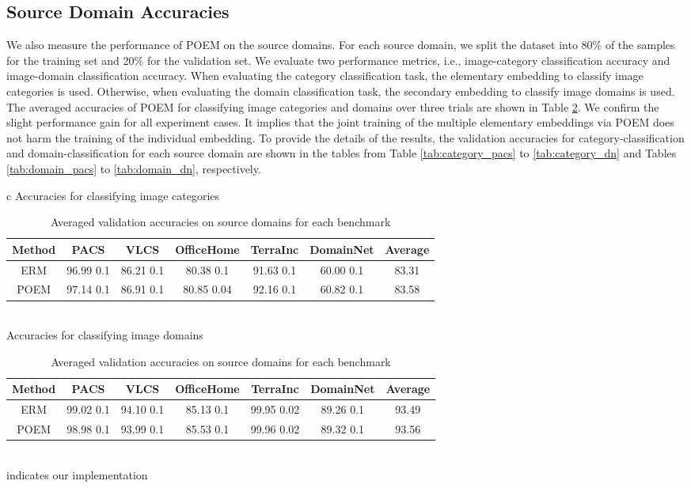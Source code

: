 \documentclass[letterpaper]{article} \usepackage{aaai23}  \usepackage{times}  \usepackage{helvet}  \usepackage{courier}  \usepackage[hyphens]{url}  \usepackage{graphicx} \urlstyle{rm} \def\UrlFont{\rm}  \usepackage{natbib}  \usepackage{caption} \frenchspacing  \setlength{\pdfpagewidth}{8.5in}  \setlength{\pdfpageheight}{11in}  \usepackage[labelsep=period]{caption}
\begin{document}
\subsection{Source Domain Accuracies}
We also measure the performance of POEM on the source domains. For each source domain, we split the dataset into 80\% of the samples for the training set and 20\% for the validation set. 
We evaluate two performance metrics, i.e., image-category classification accuracy and image-domain classification accuracy.
When evaluating the category classification task, the elementary embedding to classify image categories is used. 
Otherwise, when evaluating the domain classification task, the secondary embedding to classify image domains is used.
The averaged accuracies of POEM for classifying image categories and domains over three trials are shown in Table \ref{tab:source_performance}. We confirm the slight performance gain for all experiment cases. It implies that the joint training of the multiple elementary embeddings via POEM does not harm the training of the individual embedding.
To provide the details of the results, the validation accuracies for category-classification and domain-classification for each source domain are shown in the tables from Table \ref{tab:category_pacs} to \ref{tab:category_dn} and Tables \ref{tab:domain_pacs} to \ref{tab:domain_dn}, respectively.

\begin{table}[H]
\centering
	\begin{tabular}{c}
		Accuracies for classifying image categories\\
		\begin{tabular}{cccccc|c}
			\toprule
			\textbf{Method} & PACS & VLCS & OfficeHome & TerraInc & DomainNet & Average\\
			\midrule
			ERM & 96.99  0.1 & 86.21  0.1 & 80.38  0.1 & 91.63  0.1 & 60.00  0.1 & 83.31\\
\midrule
			POEM& 97.14  0.1 & 86.91  0.1 & 80.85  0.04 & 92.16  0.1 & 60.82  0.1 & 83.58\\
\midrule
		\end{tabular}\\
		Accuracies for classifying image domains\\
		\begin{tabular}{cccccc|c}
			\toprule
			\textbf{Method} & PACS & VLCS & OfficeHome & TerraInc & DomainNet & Average\\
			\midrule
			ERM & 99.02  0.1 & 94.10  0.1 & 85.13  0.1 & 99.95  0.02& 89.26  0.1 & 93.49\\
			\midrule
			POEM & 98.98  0.1 & 93.99  0.1 & 85.53  0.1 & 99.96  0.02& 89.32  0.1 & 93.56\\
			\hline
		\end{tabular}
	\end{tabular}
	\footnotesize{\\ indicates our implementation}\\
        \caption{Averaged validation accuracies on source domains for each benchmark}
        \label{tab:source_performance}
\end{table}
\end{document}
